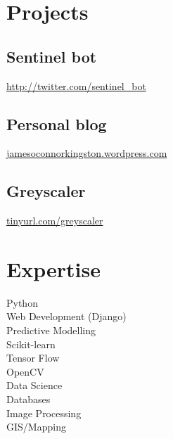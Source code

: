 \documentclass[]{JOC_CV}
\begin{document}
%
%

%
%



%
%

\begin{minipage}[t]{0.33\textwidth}


\section{Projects}\label{sec:projects}

\subsection{Sentinel bot}\label{subsec:sentinel-bot}
 \href{http://twitter.com/sentinel\_bot}{http://twitter.com/sentinel\_bot}
\subsection{Personal blog}\label{subsec:personal-blog}
\href{jamesoconnorkingston.wordpress.com}{jamesoconnorkingston.wordpress.com}
\subsection{Greyscaler}\label{subsec:greyscaler}
\href{tinyurl.com/greyscaler}{tinyurl.com/greyscaler}
\sectionsep



\section{Expertise}\label{sec:expertise}
Python \\
Web Development (Django) \\
Predictive Modelling \\
Scikit-learn \\
Tensor Flow \\
OpenCV \\
Data Science \\
Databases \\
Image Processing \\
GIS/Mapping \\
\sectionsep


\end{minipage}
\end{document}
